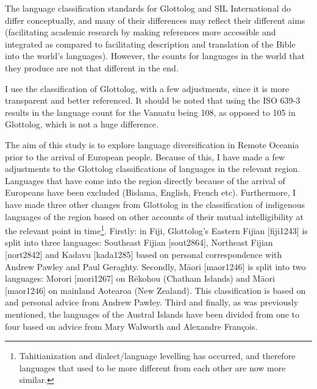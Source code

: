 \documentclass[unnumsec,webpdf,modern,medium]{oup-authoring-template}
\begin{document}
The language classification standards for Glottolog and SIL International do differ conceptually, and many of their differences may reflect their different aims (facilitating academic research by making references more accessible and integrated as compared to facilitating description and translation of the Bible into the world's languages). However, the counts for languages in the world that they produce are not that different in the end.

I use the classification of Glottolog, with a few adjustments, since it is more transparent and better referenced. It should be noted that using the ISO 639-3 results in the language count for the Vanuatu being 108, as opposed to 105 in Glottolog, which is not a huge difference. 

The aim of this study is to explore language diversification in Remote Oceania prior to the arrival of European people. Because of this, I have made a few adjustments to the Glottolog classifications of languages in the relevant region. Languages that have come into the region directly because of the arrival of Europeans have been excluded (Bislama, English, French etc). Furthermore, I have made three other changes from Glottolog in the classification of indigenous languages of the region based on other accounts of their mutual intelligibility at the relevant point in time\footnote{Tahitianization and dialect/language levelling has occurred, and therefore languages that used to be more different from each other are now more similar.}. Firstly: in Fiji, Glottolog's Eastern Fijian [fiji1243] is split into three languages: Southeast Fijian [sout2864], Northeast Fijian [nort2842] and Kadavu [kada1285] based on personal correspondence with Andrew Pawley and Paul Geraghty. Secondly, M\={a}ori [maor1246] is split into two languages: Morori [mori1267] on R\={e}kohou (Chatham Islands) and M\={a}ori [maor1246] on mainland Aotearoa (New Zealand). This classification is based on \citet{harlow1973regional} and personal advice from Andrew Pawley. Third and finally, as was previously mentioned, the languages of the Austral Islands have been divided from one to four based on advice from Mary Walworth and Alexandre François.
\end{document}
